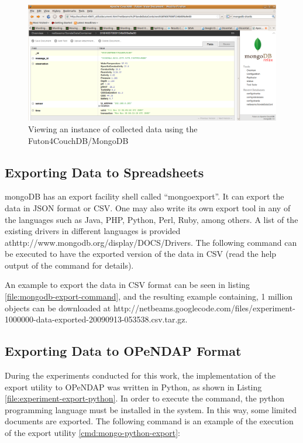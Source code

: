 \begin{figure}[!h]
  \centering
  \includegraphics[scale=0.6]{../diagrams/view-collected-data-instance-browser-futondb}
  \caption{Viewing an instance of collected data using the Futon4CouchDB/MongoDB}
  \label{fig:view-collected-data-instance-browser-futondb}
\end{figure}

\newpage

\subsection{Exporting Data to Spreadsheets}

mongoDB has an export facility shell called ``mongoexport''. It can export the
data in JSON format or CSV. One may also write its own export tool in any of the
languages such as Java, PHP, Python, Perl, Ruby, among others. A list of the
existing drivers in different languages is provided
athttp://www.mongodb.org/display/DOCS/Drivers. The following command can be
executed to have the exported version of the data in CSV (read the help output
of the command for details).

An example to export the data in CSV format can be seen in listing
\ref{file:mongodb-export-command}, and the resulting example containing, 1
million objects can be downloaded at
http://netbeams.googlecode.com/files/experiment-1000000-data-exported-20090913-053538.csv.tar.gz.

\subsection{Exporting Data to OPeNDAP Format}

During the experiments conducted for this work, the implementation of the
export utility to OPeNDAP was written in Python, as shown in Listing
\ref{file:experiment-export-python}. In order to execute the command, the
python programming language \cite{python} must be installed in the system. In
this way, some limited documents are exported. The following command is an
example of the execution of the export utility \ref{cmd:mongo-python-export}:

